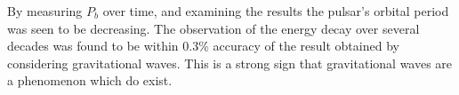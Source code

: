 By measuring \(P_b\) over time, and examining the results the pulsar's orbital period was seen to be decreasing. The observation of the energy decay over several decades was found to be within 0.3\% accuracy of the result obtained by considering gravitational waves. This is a strong sign that gravitational waves are a phenomenon which do exist.